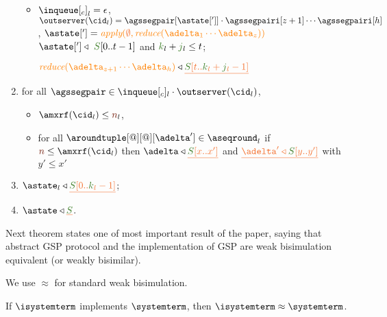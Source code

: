 \begin{definition}
\begin{enumerate}
\begin{itemize}
       
     \item ${\inclient}_l = \epsilon$, 
     $\outserver(\cid_l) = \agssegpair[{\astate[']}]\cdot\agssegpairi[z+1] \cdots \agssegpairi[h]$, 
     $\astate['] = \iapply{\initialstate}{\ireduce{\adelta_1\cdots\adelta_{z}}}$
      $\astate['] \triangleleft \ \queuemessage[0 .. t - 1]$ and $\tknown_l+\treceivebuffer_l \leq t$; 
     
     $\ireduce{\adelta_{z+1}\cdots\adelta_{h}}\triangleleft \flatten{ \queuemessage[t..\tknown_l+\treceivebuffer_l-1]}$ 
     
	
	\end{itemize}	
	
        \item \label{prop_deltas} for all $\agssegpair\in\inclient_l\cdot\outserver(\cid_l)$, 
          \begin{itemize}
          	\item $\amxrf(\cid_l)\leq\irounds_l$,
		\item  for all $\aroundtuple[@][@][\adelta'] \in\pending_l$
        if $\irounds\leq\amxrf(\cid_l)$ then $\adelta\triangleleft \flatten{\queuemessage[x..x']}$ and  $\flatten{\adelta'\triangleleft \queuemessage[y..y']}$
        with $y'\leq x'$
	\end{itemize}
	\item \label{prop_state_known} $\astate_l \triangleleft \flatten {\queuemessage[0 .. \tknown_l - 1]}$;
	
	\item \label{prop_stateserver} $\astate \triangleleft \flatten{\queuemessage}$.

\end{enumerate}



	
	
\end{definition}

Next theorem states one of most important result of the paper, saying that abstract GSP protocol and the implementation of GSP are weak bisimulation equivalent (or weakly bisimilar).

We use $\approx$ for standard weak bisimulation.

\begin{theorem}
\label{thm:simulation}
 If  $\isystemterm$ implements $\systemterm$, then $\isystemterm\approx\systemterm$. 
\end{theorem}


